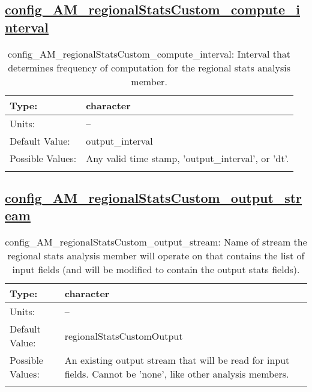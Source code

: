 \subsection[config\_AM\_regionalStatsCustom\_compute\_interval]{\hyperref[sec:nm_tab_AM_regionalStatsCustom]{config\_AM\_regionalStatsCustom\_compute\_interval}}
\label{subsec:nm_sec_config_AM_regionalStatsCustom_compute_interval}
\begin{center}
\begin{longtable}{| p{2.0in} || p{4.0in} |}
    \hline
    Type: & character \\
    \hline
    Units: & -- \\
    \hline
    Default Value: & output\_interval \\
    \hline
    Possible Values: & Any valid time stamp, 'output\_interval', or 'dt'. \\
    \hline
    \caption{config\_AM\_regionalStatsCustom\_compute\_interval: Interval that determines frequency of computation for the regional stats analysis member.}
\end{longtable}
\end{center}
\subsection[config\_AM\_regionalStatsCustom\_output\_stream]{\hyperref[sec:nm_tab_AM_regionalStatsCustom]{config\_AM\_regionalStatsCustom\_output\_stream}}
\label{subsec:nm_sec_config_AM_regionalStatsCustom_output_stream}
\begin{center}
\begin{longtable}{| p{2.0in} || p{4.0in} |}
    \hline
    Type: & character \\
    \hline
    Units: & -- \\
    \hline
    Default Value: & regionalStatsCustomOutput \\
    \hline
    Possible Values: & An existing output stream that will be read for input fields. Cannot be 'none', like other analysis members. \\
    \hline
    \caption{config\_AM\_regionalStatsCustom\_output\_stream: Name of stream the regional stats analysis member will operate on that contains the list of input fields (and will be modified to contain the output stats fields).}
\end{longtable}
\end{center}
